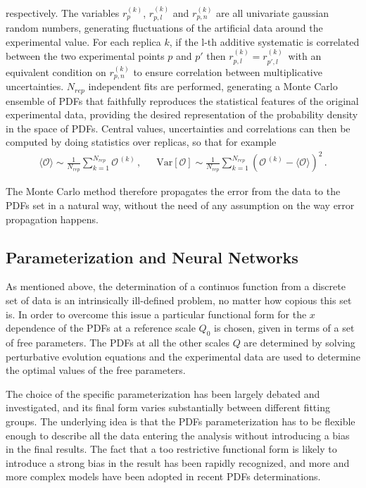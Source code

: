respectively. The variables $r_{p}^{(k)}$, $r_{p,l}^{(k)}$ and $r_{p,n}^{(k)}$
are all univariate gaussian random numbers, generating fluctuations of the artificial data around the experimental value.
For each replica $k$, if the l-th additive systematic is correlated between the two experimental points $p$ and $p'$
then $r_{p,l}^{(k)} = r_{p',l}^{(k)}\,$ with an equivalent condition on $r_{p,n}^{(k)}$ to ensure correlation between multiplicative
uncertainties. 
$N_{rep}$ independent fits are performed, generating a Monte Carlo ensemble of
PDFs that faithfully reproduces the statistical features of the original experimental 
data, providing the desired representation of the probability density in the space of PDFs.
Central values, uncertainties and correlations can then be computed by doing statistics over
replicas, so that for example
\begin{align}
    \label{eq:expectation_value_observable_mc}
    \langle \mathcal{O}\rangle \sim \frac{1}{N_{rep}}\sum_{k=1}^{N_{rep}}
    \mathcal{O}^{\,(k)}\,,\,\,\,\,\,\,\,\,\,
    \text{Var}\left[\mathcal{O}\right] \sim 
    \frac{1}{N_{rep}}\sum_{k=1}^{N_{rep}}\left(\mathcal{O}^{\,(k)} - \langle\mathcal{O}\rangle\right)^2\,.
\end{align}

The Monte Carlo method therefore propagates the error from the data to the PDFs set
in a natural way, without the need of any assumption on the way error propagation happens.

\subsection{Parameterization and Neural Networks}
As mentioned above, the determination of a continuos function from a discrete set of data 
is an intrinsically ill-defined problem, no matter how copious this set is. In order to overcome this
issue a particular functional form for the $x$ dependence of the PDFs at a reference scale $Q_0$ is chosen,
given in terms of a set of free parameters.
The PDFs at all the other scales $Q$ are determined by solving perturbative evolution equations
and the experimental data are used to determine the optimal values of the free parameters.

%
The choice of the specific parameterization has been largely debated and investigated,
and its final form varies substantially between different fitting groups.
The underlying idea is that the PDFs parameterization has to be flexible enough to describe all the data
entering the analysis without introducing a bias in the final results.
The fact that a too restrictive functional form is likely to introduce a strong bias in the result
has been rapidly recognized, and more and more complex models have been adopted in recent PDFs determinations.

